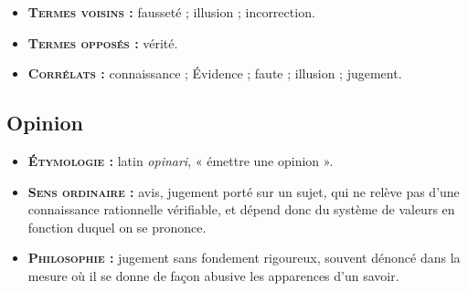 {\footnotesize
\begin{itemize}[leftmargin=1cm, label=, itemsep=1pt]
\item {\bf \textsc{Termes voisins} :} fausseté ; illusion ;
incorrection.
\item {\bf \textsc{Termes opposés} :} vérité.
\item {\bf \textsc{Corrélats} :} connaissance ; Évidence ;
faute ; illusion ; jugement.
\end{itemize}
}


\subsection{Opinion}

{\footnotesize
\begin{itemize}[leftmargin=1cm, label=, itemsep=1pt]
\item {\bf \textsc{Étymologie} :} latin {\it opinari},
« émettre une opinion ».
\item {\bf \textsc{Sens ordinaire} :} avis,
jugement porté sur
un sujet, qui ne relève pas d'une
connaissance rationnelle vérifiable,
et dépend donc du système de
valeurs en fonction duquel on se
prononce.
\item {\bf \textsc{Philosophie} :} jugement
sans fondement rigoureux,
souvent dénoncé dans la mesure où
il se donne de façon abusive les
apparences d’un savoir.
\end{itemize}
}

